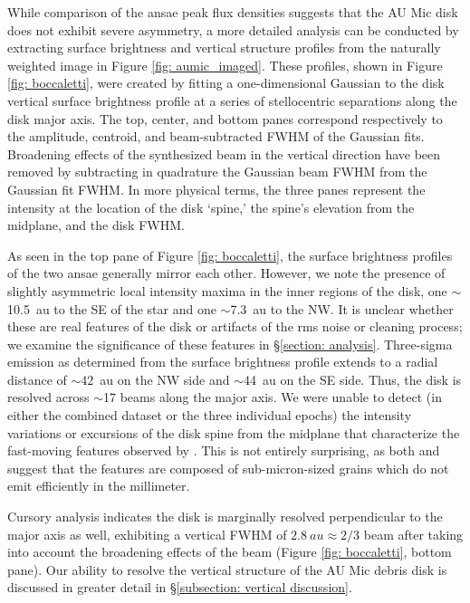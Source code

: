\documentclass[modern]{aastex62}
\begin{document}
While comparison of the ansae peak flux densities suggests that the AU Mic disk does not exhibit severe asymmetry, a more detailed analysis can be conducted by extracting surface brightness and vertical structure profiles from the naturally weighted image in Figure \ref{fig: aumic_imaged}.
These profiles, shown in Figure \ref{fig: boccaletti}, were created by fitting a one-dimensional Gaussian to the disk vertical surface brightness profile at a series of stellocentric separations along the disk major axis.
The top, center, and bottom panes correspond respectively to the amplitude, centroid, and beam-subtracted FWHM of the Gaussian fits. 
Broadening effects of the synthesized beam in the vertical direction have been removed by subtracting in quadrature the Gaussian beam FWHM from the Gaussian fit FWHM.
In more physical terms, the three panes represent the intensity at the location of the disk `spine,' the spine's elevation from the midplane, and the disk FWHM.

As seen in the top pane of Figure \ref{fig: boccaletti}, the surface brightness profiles of the two ansae generally mirror each other.
However, we note the presence of slightly asymmetric local intensity maxima in the inner regions of the disk, one $\sim$\SI{10.5}{au} to the SE of the star and one $\sim$\SI{7.3}{au} to the NW. 
It is unclear whether these are real features of the disk or artifacts of the rms noise or cleaning process; we examine the significance of these features in \S \ref{section: analysis}.
Three-sigma emission as determined from the surface brightness profile extends to a radial distance of $\sim$\SI{42}{au} on the NW side and $\sim$\SI{44}{au} on the SE side. 
Thus, the disk is resolved across $\sim$17 beams along the major axis. 
We were unable to detect (in either the combined dataset or the three individual epochs) the intensity variations or excursions of the disk spine from the midplane that characterize the fast-moving features observed by \citet{boccaletti15,boccaletti18}.
This is not entirely surprising, as both \citet{sezestre17} and \citet{chiang&fung17} suggest that the features are composed of sub-micron-sized grains which do not emit efficiently in the millimeter.

Cursory analysis indicates the disk is marginally resolved perpendicular to the major axis as well, exhibiting a vertical FWHM of $\SI{2.8}{au} \approx 2/3$ beam after taking into account the broadening effects of the beam (Figure \ref{fig: boccaletti}, bottom pane).
Our ability to resolve the vertical structure of the AU Mic debris disk is discussed in greater detail in \S \ref{subsection: vertical discussion}.
\end{document}
